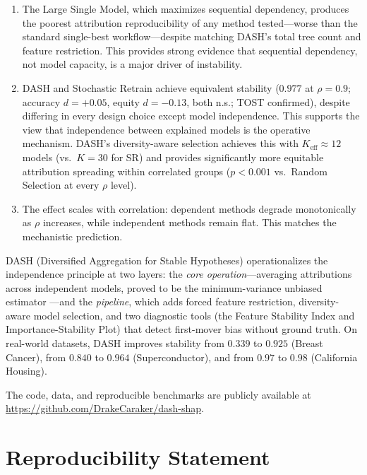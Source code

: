\documentclass[11pt]{article}
\newcommand{\dash}{\textsc{DASH}}
\newcommand{\rhovar}{\rho}
\begin{document}
\begin{enumerate}
  \item The Large Single Model, which maximizes sequential dependency,
    produces the poorest attribution reproducibility of any method tested---worse
    than the standard single-best workflow---despite matching \dash{}'s
    total tree count and feature restriction. This provides strong evidence that
    sequential dependency, not model capacity, is a major driver of instability.
  \item \dash{} and Stochastic Retrain achieve equivalent
    stability ($0.977$ at $\rhovar = 0.9$; accuracy $d = +0.05$,
    equity $d = -0.13$, both n.s.; TOST confirmed),
    despite differing in every design choice except model independence.
    This supports the view that independence between explained models is the
    operative mechanism. \dash{}'s diversity-aware selection achieves this
    with $K_{\text{eff}} \approx 12$ models (vs.\ $K = 30$ for SR) and
    provides significantly more equitable attribution spreading within
    correlated groups ($p < 0.001$ vs.\ Random Selection at every
    $\rhovar$ level).
  \item The effect scales with correlation: dependent methods degrade
    monotonically as $\rhovar$ increases, while independent methods
    remain flat. This matches the mechanistic prediction.
\end{enumerate}

\dash{} (Diversified Aggregation for Stable Hypotheses) operationalizes the
independence principle at two layers: the \emph{core operation}---averaging
attributions across independent models, proved to be the minimum-variance
unbiased estimator \citep{caraker2026impossibility}---and the
\emph{pipeline}, which adds forced feature restriction, diversity-aware
model selection, and two diagnostic tools (the Feature Stability
Index and Importance-Stability Plot) that detect first-mover bias
without ground truth. On real-world datasets, \dash{} improves stability
from $0.339$ to $0.925$ (Breast Cancer), from $0.840$ to $0.964$
(Superconductor), and from $0.97$ to $0.98$ (California Housing).

The code, data, and reproducible benchmarks are publicly available at
\url{https://github.com/DrakeCaraker/dash-shap}.


\section*{Reproducibility Statement}
\end{document}
